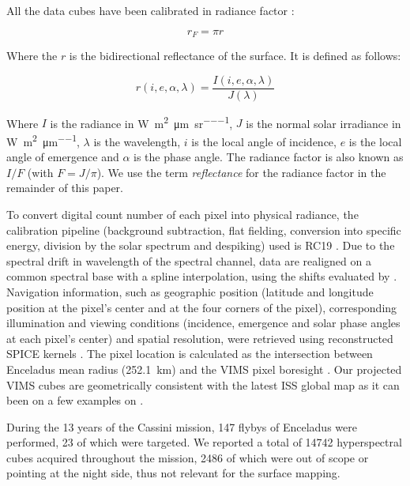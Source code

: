 \documentclass{arxiv-icarus}
\begin{document}
All the data cubes have been calibrated in radiance factor \citep{Hapke1981}:

\vspace{-.3cm}
\begin{equation}
    r_F = \pi r
\end{equation}

Where the $r$ is the bidirectional reflectance of the surface. It is defined as follows:

\vspace{-.15cm}
\begin{equation}
    r(i, e, \alpha, \lambda) = \frac{I(i, e, \alpha, \lambda)}{J(\lambda)}
\end{equation}

\vfill\null

Where $I$ is the radiance in \si{\watt\per\square\meter\per\um\per\steradian}, $J$ is the normal solar irradiance in \si{\watt\per\square\meter\per\um}, $\lambda$ is the wavelength, $i$ is the local angle of incidence, $e$ is the local angle of emergence and $\alpha$ is the phase angle. The radiance factor is also known as $I/F$ (with $F = J / \pi$). We use the term \emph{reflectance} for the radiance factor in the remainder of this paper.

To convert digital count number of each pixel into physical radiance, the calibration pipeline (background subtraction, flat fielding, conversion into specific energy, division by the solar spectrum and despiking) used is RC19 \citep{Clark2018}. Due to the spectral drift in wavelength of the spectral channel, data are realigned on a common spectral base with a spline interpolation, using the shifts evaluated by \cite{Clark2018}. Navigation information, such as geographic position (latitude and longitude position at the pixel's center and at the four corners of the pixel), corresponding illumination and viewing conditions (incidence, emergence and solar phase angles at each pixel's center) and spatial resolution, were retrieved using reconstructed SPICE kernels \citep{Acton1996}. The pixel location is calculated as the intersection between Enceladus mean radius (\SI{252.1}{km}) and the VIMS pixel boresight \citep{Nicholson2019}. Our projected VIMS cubes are geometrically consistent with the latest ISS global map \citep{Bland2018} as it can been on a few examples on .

During the 13 years of the Cassini mission, 147 flybys of Enceladus were performed, 23 of which were targeted. We reported a total of \num{14742} hyperspectral cubes acquired throughout the mission, \num{2486} of which were out of scope or pointing at the night side, thus not relevant for the surface mapping.
\end{document}
